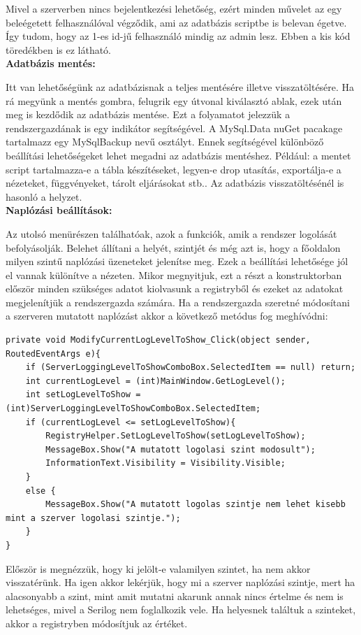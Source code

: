 \documentclass[
]{thesis-ekf}
\theoremstyle{definition}
\theoremstyle{remark}
\begin{document}
Mivel a szerverben nincs bejelentkezési lehetőség, ezért minden művelet az egy beleégetett felhasználóval végződik, ami az adatbázis scriptbe is belevan égetve. Így tudom, hogy az 1-es id-jű felhasználó mindig az admin lesz. Ebben a kis kód töredékben is ez látható.\\
\textbf{Adatbázis mentés: }

Itt van lehetőségünk az adatbázisnak a teljes mentésére illetve visszatöltésére. Ha rá megyünk a mentés gombra, felugrik egy útvonal kiválasztó ablak, ezek után meg is kezdődik az adatbázis mentése. Ezt a folyamatot jelezzük a rendszergazdának is egy indikátor segítségével. A MySql.Data nuGet pacakage tartalmazz egy MySqlBackup nevű osztályt. Ennek segítségével különböző beállítási lehetőségeket lehet megadni az adatbázis mentéshez. Például: a mentet script tartalmazza-e a tábla készítéseket, legyen-e drop utasítás, exportálja-e a nézeteket, függvényeket, tárolt eljárásokat stb.. Az adatbázis visszatöltésénél is hasonló a helyzet.\\
\textbf{Naplózási beállítások: }

Az utolsó menürészen találhatóak, azok a funkciók, amik a rendszer logolását befolyásolják. Belehet állítani a helyét, szintjét és még azt is, hogy a főoldalon milyen szintű naplózási üzeneteket jelenítse meg. Ezek a beállítási lehetősége jól el vannak különítve a nézeten. Mikor megnyitjuk, ezt a részt a konstruktorban először minden szükséges adatot kiolvasunk a registryből és ezeket az adatokat megjelenítjük a rendszergazda számára. Ha a rendszergazda szeretné módosítani a szerveren mutatott naplózást akkor a következő metódus fog meghívódni:
\begin{lstlisting}[showstringspaces=false, caption={A szerveren mutatott naplózás beállítása.}, captionpos=b]
private void ModifyCurrentLogLevelToShow_Click(object sender, RoutedEventArgs e){
	if (ServerLoggingLevelToShowComboBox.SelectedItem == null) return;
	int currentLogLevel = (int)MainWindow.GetLogLevel();
	int setLogLevelToShow = (int)ServerLoggingLevelToShowComboBox.SelectedItem;
	if (currentLogLevel <= setLogLevelToShow){
		RegistryHelper.SetLogLevelToShow(setLogLevelToShow);
		MessageBox.Show("A mutatott logolasi szint modosult");
		InformationText.Visibility = Visibility.Visible;
	}
	else {
		MessageBox.Show("A mutatott logolas szintje nem lehet kisebb mint a szerver logolasi szintje.");
	}
}
\end{lstlisting}
Először is megnézzük, hogy ki jelölt-e valamilyen szintet, ha nem akkor visszatérünk. Ha igen akkor lekérjük, hogy mi a szerver naplózási szintje, mert ha alacsonyabb a szint, mint amit mutatni akarunk annak nincs értelme és nem is lehetséges, mivel a Serilog nem foglalkozik vele. Ha helyesnek találtuk a szinteket, akkor a registryben módosítjuk az értéket. 
\end{document}
